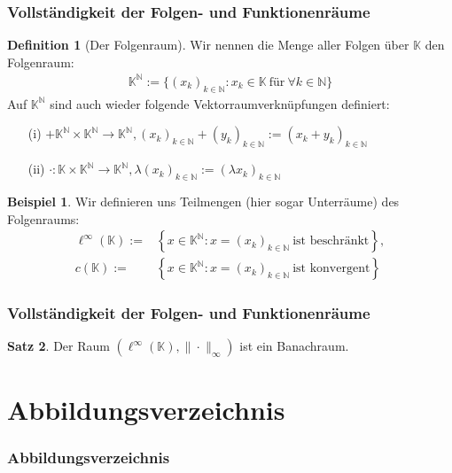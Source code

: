\documentclass[t, handout]{beamer}
\newcommand{\N}{\mathbb{N}}
\newcommand{\K}{\mathbb{K}}
\theoremstyle{definition} %
\newtheorem{sa}{Satz}[section] %
\newtheorem{dfi}[sa]{Definition} %
\newtheorem*{bsp}{Beispiel}
\begin{document}
\begin{frame}
\frametitle{Vollständigkeit der Folgen- und Funktionenräume}
\begin{dfi}[Der Folgenraum]
Wir nennen die Menge aller Folgen über $\K$ den Folgenraum:
\begin{align*}
\K^\N := \{{(x_k)}_{k \in \N} : x_k \in \K \: \text{für} \: \forall k \in \N\}
\end{align*}
Auf  $\K^\N$ sind auch wieder folgende Vektorraumverknüpfungen definiert:
\begin{itemize}
\item[(i)]  $+ \K^\N \times \K^\N \rightarrow \K^\N, {(x_k)}_{k \in \N} + {(y_k)}_{k \in \N} := (x_k + y_k)_{k \in \N}$\\
\item[(ii)] $\cdot : \K \times \K^\N \rightarrow \K^\N, \lambda{(x_k)}_{k \in \N} := {(\lambda x_k)}_{k \in \N}$\\
\end{itemize}
\end{dfi}
\pause
\begin{bsp}
Wir definieren uns Teilmengen (hier sogar Unterräume) des Folgenraums:
\begin{align*}
\ell^\infty(\K) := &\left\{x \in \K^\N : x = {(x_k)}_{k \in \N} \: \text{ist beschränkt} \right\},\\
c(\K) := &\left\{x \in \K^\N : x = {(x_k)}_{k \in \N} \: \text{ist konvergent} \right\}
\end{align*}
\end{bsp}
\end{frame}

\begin{frame}
\frametitle{Vollständigkeit der Folgen- und Funktionenräume}
\begin{sa}
Der Raum $(\ell^\infty(\K), \|\cdot\|_\infty)$ ist ein Banachraum.
\end{sa}
\end{frame}

\section{Abbildungsverzeichnis}

\begin{frame}
\frametitle{Abbildungsverzeichnis}
\printbibliography[heading=none, nottype=article, nottype=book]
\end{frame}
\end{document}
